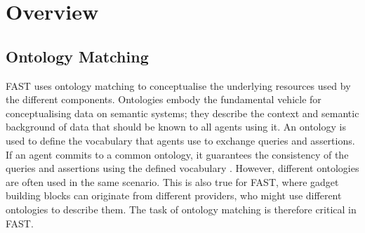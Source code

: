 
% 

\section{Overview}
\subsection{Ontology Matching}
\label{mediation}

FAST uses ontology matching to conceptualise the underlying resources used by the different components.
Ontologies embody the fundamental vehicle for conceptualising data on semantic systems; they describe the context and semantic background of data that should be known to all agents using it. An ontology is used to define the vocabulary that agents use to exchange  queries and assertions. If an agent commits to a common ontology, it guarantees the consistency of the queries and assertions using the defined vocabulary \cite{gruber93towards}.
However, different ontologies are often used in the same scenario. This is also true for FAST, where gadget building blocks can originate from different providers, who might use different ontologies to describe them.  The task of ontology matching is therefore critical in FAST.

